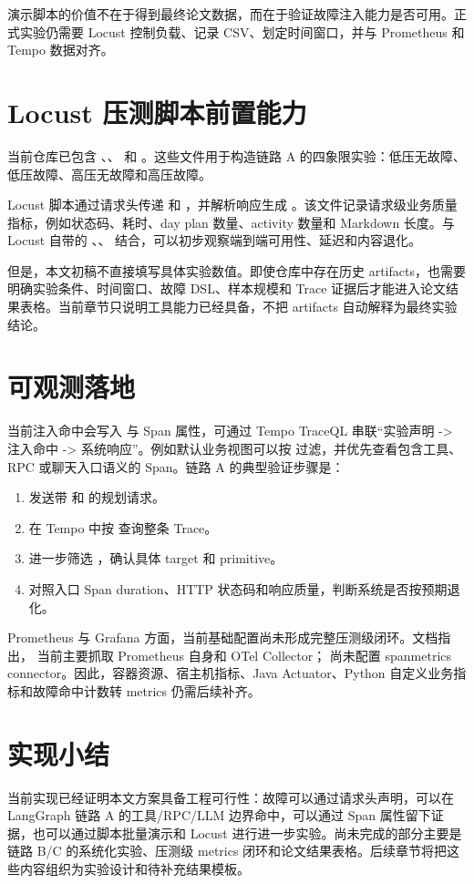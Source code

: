 演示脚本的价值不在于得到最终论文数据，而在于验证故障注入能力是否可用。正式实验仍需要 Locust 控制负载、记录 CSV、划定时间窗口，并与 Prometheus 和 Tempo 数据对齐。

\section{Locust 压测脚本前置能力}

当前仓库已包含 、、 和 。这些文件用于构造链路 A 的四象限实验：低压无故障、低压故障、高压无故障和高压故障。

Locust 脚本通过请求头传递  和 ，并解析响应生成 。该文件记录请求级业务质量指标，例如状态码、耗时、day plan 数量、activity 数量和 Markdown 长度。与 Locust 自带的 、、 结合，可以初步观察端到端可用性、延迟和内容退化。

但是，本文初稿不直接填写具体实验数值。即使仓库中存在历史 artifacts，也需要明确实验条件、时间窗口、故障 DSL、样本规模和 Trace 证据后才能进入论文结果表格。当前章节只说明工具能力已经具备，不把 artifacts 自动解释为最终实验结论。

\section{可观测落地}

当前注入命中会写入  与  Span 属性，可通过 Tempo TraceQL 串联“实验声明 -> 注入命中 -> 系统响应”。例如默认业务视图可以按  过滤，并优先查看包含工具、RPC 或聊天入口语义的 Span。链路 A 的典型验证步骤是：

\begin{enumerate}
  \item 发送带  和  的规划请求。
  \item 在 Tempo 中按  查询整条 Trace。
  \item 进一步筛选 ，确认具体 target 和 primitive。
  \item 对照入口 Span duration、HTTP 状态码和响应质量，判断系统是否按预期退化。
\end{enumerate}

Prometheus 与 Grafana 方面，当前基础配置尚未形成完整压测级闭环。文档指出， 当前主要抓取 Prometheus 自身和 OTel Collector； 尚未配置 spanmetrics connector。因此，容器资源、宿主机指标、Java Actuator、Python 自定义业务指标和故障命中计数转 metrics 仍需后续补齐。

\section{实现小结}

当前实现已经证明本文方案具备工程可行性：故障可以通过请求头声明，可以在 LangGraph 链路 A 的工具/RPC/LLM 边界命中，可以通过 Span 属性留下证据，也可以通过脚本批量演示和 Locust 进行进一步实验。尚未完成的部分主要是链路 B/C 的系统化实验、压测级 metrics 闭环和论文结果表格。后续章节将把这些内容组织为实验设计和待补充结果模板。
